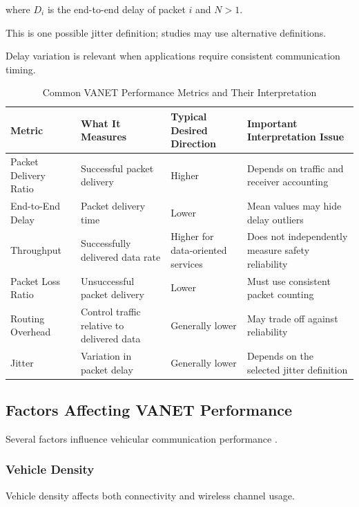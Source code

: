 where $D_i$ is the end-to-end
delay of packet $i$ and $N>1$.

This is one possible jitter
definition; studies may use
alternative definitions.

Delay variation is relevant
when applications require
consistent communication timing.

\begin{table}[t]
\centering
\caption{Common VANET Performance Metrics and Their Interpretation}
\label{tab:performance_metrics}
\footnotesize
\begin{tabular}{|p{3.1cm}|p{3.6cm}|p{3.5cm}|p{4.1cm}|}
\hline
\textbf{Metric} &
\textbf{What It Measures} &
\textbf{Typical Desired Direction} &
\textbf{Important Interpretation Issue} \\
\hline
Packet Delivery Ratio &
Successful packet delivery &
Higher &
Depends on traffic and receiver accounting \\
\hline
End-to-End Delay &
Packet delivery time &
Lower &
Mean values may hide delay outliers \\
\hline
Throughput &
Successfully delivered data rate &
Higher for data-oriented services &
Does not independently measure safety reliability \\
\hline
Packet Loss Ratio &
Unsuccessful packet delivery &
Lower &
Must use consistent packet counting \\
\hline
Routing Overhead &
Control traffic relative to delivered data &
Generally lower &
May trade off against reliability \\
\hline
Jitter &
Variation in packet delay &
Generally lower &
Depends on the selected jitter definition \\
\hline
\end{tabular}
\end{table}

\subsection{Factors Affecting VANET Performance}
\label{sec:4E}

Several factors influence
vehicular communication performance
\cite{Zeadally2012}.

\subsubsection{Vehicle Density}

Vehicle density affects both
connectivity and wireless
channel usage.

